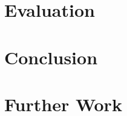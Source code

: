 \documentclass[a4paper]{report}
\begin{document}
\chapter{Evaluation}

\chapter{Conclusion}

\chapter{Further Work}


\clearpage



\end{document}
